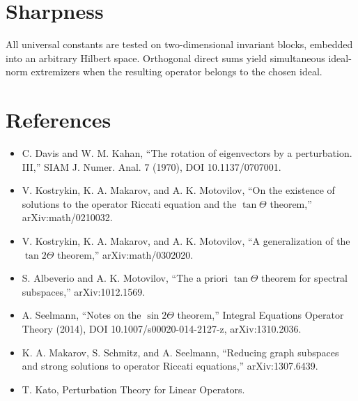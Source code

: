 \documentclass{article}
\begin{document}
\section{Sharpness}
All universal constants are tested on two-dimensional invariant blocks,
embedded into an arbitrary Hilbert space.  Orthogonal direct sums yield
simultaneous ideal-norm extremizers when the resulting operator belongs to the
chosen ideal.

\section{References}
\begin{itemize}
\item C. Davis and W. M. Kahan, ``The rotation of eigenvectors by a perturbation. III,'' SIAM J. Numer. Anal. 7 (1970), DOI 10.1137/0707001.
\item V. Kostrykin, K. A. Makarov, and A. K. Motovilov, ``On the existence of solutions to the operator Riccati equation and the $\tan\Theta$ theorem,'' arXiv:math/0210032.
\item V. Kostrykin, K. A. Makarov, and A. K. Motovilov, ``A generalization of the $\tan 2\Theta$ theorem,'' arXiv:math/0302020.
\item S. Albeverio and A. K. Motovilov, ``The a priori $\tan\Theta$ theorem for spectral subspaces,'' arXiv:1012.1569.
\item A. Seelmann, ``Notes on the $\sin 2\Theta$ theorem,'' Integral Equations Operator Theory (2014), DOI 10.1007/s00020-014-2127-z, arXiv:1310.2036.
\item K. A. Makarov, S. Schmitz, and A. Seelmann, ``Reducing graph subspaces and strong solutions to operator Riccati equations,'' arXiv:1307.6439.
\item T. Kato, Perturbation Theory for Linear Operators.
\end{itemize}
\end{document}

